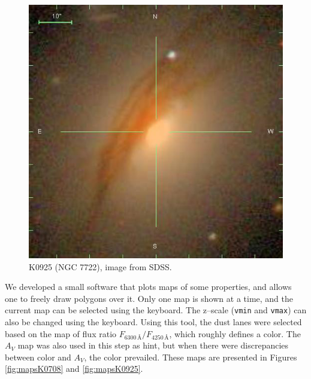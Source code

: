 \documentclass[a4paper]{article}
\newcommand{\angstrom}{\text{\AA}}
\begin{document}
\begin{figure}
\begin{center}
\includegraphics[width=0.6\columnwidth]{figures/K0925.png}
\end{center}

\caption{K0925 (NGC 7722), image from SDSS.}
\label{fig:sdssK0925}
\end{figure}

We developed a small software that plots maps of some properties, and allows one
to freely draw polygons over it. Only one map is shown at a time, and the
current map can be selected using the keyboard. The z--scale (\texttt{vmin} and
\texttt{vmax}) can also be changed using the keyboard. Using this tool, the dust
lanes were selected based on the map of flux ratio $F_{6300\,\angstrom} /
F_{4250\,\angstrom}$, which roughly defines a color.
The $A_V$ map was also used in this step as hint, but when there were
discrepancies between color and $A_V$, the color prevailed. These maps are
presented in Figures \ref{fig:mapsK0708} and \ref{fig:mapsK0925}.
\end{document}
